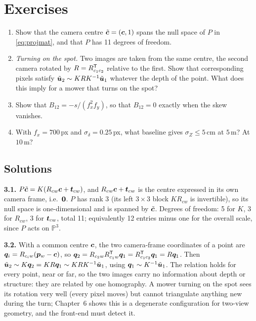 \FloatBarrier
\section*{Exercises}

\begin{enumerate}[label=\textbf{3.\arabic*},ref=3.\arabic*]
\item\label{ex:3centre} Show that the camera centre $\tilde{\bm{c}}=
  (\bm{c},1)$ spans the null space of $P$ in \eqref{eq:projmat}, and
  that $P$ has 11 degrees of freedom.
\item\label{ex:3rot} \emph{Turning on the spot.} Two images are taken
  from the same centre, the second camera rotated by $R=R_{c_1c_2}^{\mathsf{T}}$
  relative to the first. Show that corresponding pixels satisfy
  $\tilde{\bm{u}}_2\sim KRK^{-1}\tilde{\bm{u}}_1$ whatever the depth
  of the point. What does this imply for a mower that turns on the spot?
\item\label{ex:3skew} Show that $B_{12}=-s/(f_x^2f_y)$, so that
  $B_{12}=0$ exactly when the skew vanishes.
\item\label{ex:3base} With $f_x=700$\,px and $\sigma_\delta=0.25$\,px,
  what baseline gives $\sigma_Z\le5$\,cm at $5$\,m? At $10$\,m?
\end{enumerate}

\subsection*{Solutions}

\textbf{3.1.} $P\tilde{\bm{c}}=K(R_{cw}\bm{c}+\bm{t}_{cw})$, and
$R_{cw}\bm{c}+\bm{t}_{cw}$ is the centre expressed in its own camera
frame, i.e.\ $\bm{0}$. $P$ has rank 3 (its left $3\times3$ block
$KR_{cw}$ is invertible), so its null space is one-dimensional and is
spanned by $\tilde{\bm{c}}$. Degrees of freedom: 5 for $K$, 3 for
$R_{cw}$, 3 for $\bm{t}_{cw}$, total 11; equivalently 12 entries
minus one for the overall scale, since $P$ acts on $\mathbb{P}^3$.

\textbf{3.2.} With a common centre $\bm{c}$, the two camera-frame
coordinates of a point are $\bm{q}_i=R_{c_iw}(\bm{p}_w-\bm{c})$, so
$\bm{q}_2=R_{c_2w}R_{c_1w}^{\mathsf{T}}\bm{q}_1=R_{c_1c_2}^{\mathsf{T}}\bm{q}_1=R
\bm{q}_1$. Then $\tilde{\bm{u}}_2\sim K\bm{q}_2=KR\bm{q}_1\sim
KRK^{-1}\tilde{\bm{u}}_1$, using $\bm{q}_1\sim K^{-1}\tilde{\bm{u}}
_1$. The relation holds for every point, near or far, so the two images
carry no information about depth or structure: they are related by one
homography. A mower turning on the spot sees its rotation very well
(every pixel moves) but cannot triangulate anything new during the turn;
Chapter~6 shows this is a degenerate configuration for two-view
geometry, and the front-end must detect it.

